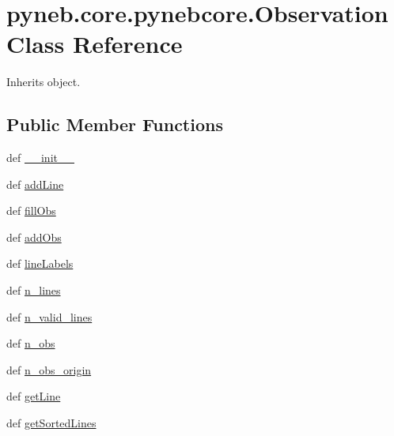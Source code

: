 \hypertarget{classpyneb_1_1core_1_1pynebcore_1_1_observation}{\section{pyneb.\-core.\-pynebcore.\-Observation Class Reference}
\label{classpyneb_1_1core_1_1pynebcore_1_1_observation}
}


Inherits object.

\subsection*{Public Member Functions}
\begin{DoxyCompactItemize}
\item 
def \hyperlink{classpyneb_1_1core_1_1pynebcore_1_1_observation_a4f72b542ac93dd5376e05c7c44015409}{\-\_\-\-\_\-init\-\_\-\-\_\-}
\item 
def \hyperlink{classpyneb_1_1core_1_1pynebcore_1_1_observation_a17ddf1c03fd1859cafe36d0593ec5f01}{add\-Line}
\item 
def \hyperlink{classpyneb_1_1core_1_1pynebcore_1_1_observation_a106a6b30219b5d9778713936c2a3064d}{fill\-Obs}
\item 
def \hyperlink{classpyneb_1_1core_1_1pynebcore_1_1_observation_a301e67ff50a467e97cd929039607a5d0}{add\-Obs}
\item 
def \hyperlink{classpyneb_1_1core_1_1pynebcore_1_1_observation_a6ec53301ec68e138d4347f501ff7f711}{line\-Labels}
\item 
def \hyperlink{classpyneb_1_1core_1_1pynebcore_1_1_observation_a784301f3cabf9c7dbe4e7dcef0700ae8}{n\-\_\-lines}
\item 
def \hyperlink{classpyneb_1_1core_1_1pynebcore_1_1_observation_aff6380f5f386282310ec1937b683e25f}{n\-\_\-valid\-\_\-lines}
\item 
def \hyperlink{classpyneb_1_1core_1_1pynebcore_1_1_observation_a3c9122167ef525b73a62d39d4b5c4239}{n\-\_\-obs}
\item 
def \hyperlink{classpyneb_1_1core_1_1pynebcore_1_1_observation_aa0044049cd44807364a0c0957e5c3740}{n\-\_\-obs\-\_\-origin}
\item 
def \hyperlink{classpyneb_1_1core_1_1pynebcore_1_1_observation_a9994c84a500a6a31a5376ed6c7782ce3}{get\-Line}
\item 
def \hyperlink{classpyneb_1_1core_1_1pynebcore_1_1_observation_a2b18c06854c5492b53b7e91311bf1cff}{get\-Sorted\-Lines}
\item 

\end{DoxyCompactItemize}

